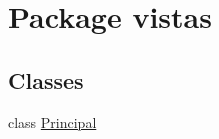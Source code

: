 \hypertarget{namespacevistas}{}\section{Package vistas}
\label{namespacevistas}
\subsection*{Classes}
\begin{DoxyCompactItemize}
\item 
class \mbox{\hyperlink{classvistas_1_1_principal}{Principal}}
\end{DoxyCompactItemize}
